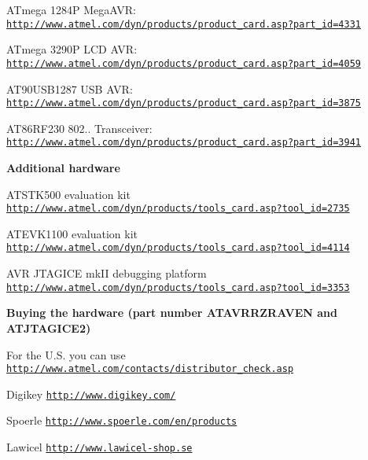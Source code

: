  \begin{DoxyItemize}
\item A\+Tmega 1284P Mega\+A\+VR\+: \href{http://www.atmel.com/dyn/products/product_card.asp?part_id=4331}{\tt http\+://www.\+atmel.\+com/dyn/products/product\+\_\+card.\+asp?part\+\_\+id=4331} \item A\+Tmega 3290P L\+CD A\+VR\+: \href{http://www.atmel.com/dyn/products/product_card.asp?part_id=4059}{\tt http\+://www.\+atmel.\+com/dyn/products/product\+\_\+card.\+asp?part\+\_\+id=4059} \item A\+T90\+U\+S\+B1287 U\+SB A\+VR\+: \href{http://www.atmel.com/dyn/products/product_card.asp?part_id=3875}{\tt http\+://www.\+atmel.\+com/dyn/products/product\+\_\+card.\+asp?part\+\_\+id=3875} \item A\+T86\+R\+F230 802.. Transceiver\+: \href{http://www.atmel.com/dyn/products/product_card.asp?part_id=3941}{\tt http\+://www.\+atmel.\+com/dyn/products/product\+\_\+card.\+asp?part\+\_\+id=3941}\end{DoxyItemize}
{\bfseries Additional hardware}~\newline
 \begin{DoxyItemize}
\item A\+T\+S\+T\+K500 evaluation kit \href{http://www.atmel.com/dyn/products/tools_card.asp?tool_id=2735}{\tt http\+://www.\+atmel.\+com/dyn/products/tools\+\_\+card.\+asp?tool\+\_\+id=2735} \item A\+T\+E\+V\+K1100 evaluation kit \href{http://www.atmel.com/dyn/products/tools_card.asp?tool_id=4114}{\tt http\+://www.\+atmel.\+com/dyn/products/tools\+\_\+card.\+asp?tool\+\_\+id=4114} \item A\+VR J\+T\+A\+G\+I\+CE mk\+II debugging platform \href{http://www.atmel.com/dyn/products/tools_card.asp?tool_id=3353}{\tt http\+://www.\+atmel.\+com/dyn/products/tools\+\_\+card.\+asp?tool\+\_\+id=3353}\end{DoxyItemize}
{\bfseries Buying the hardware (part number A\+T\+A\+V\+R\+R\+Z\+R\+A\+V\+EN and A\+T\+J\+T\+A\+G\+I\+C\+E2)}~\newline
 \begin{DoxyItemize}
\item For the U.\+S. you can use \href{http://www.atmel.com/contacts/distributor_check.asp}{\tt http\+://www.\+atmel.\+com/contacts/distributor\+\_\+check.\+asp} \item Digikey \href{http://www.digikey.com/}{\tt http\+://www.\+digikey.\+com/} \item Spoerle \href{http://www.spoerle.com/en/products}{\tt http\+://www.\+spoerle.\+com/en/products} \item Lawicel \href{http://www.lawicel-shop.se}{\tt http\+://www.\+lawicel-\/shop.\+se}\end{DoxyItemize}
